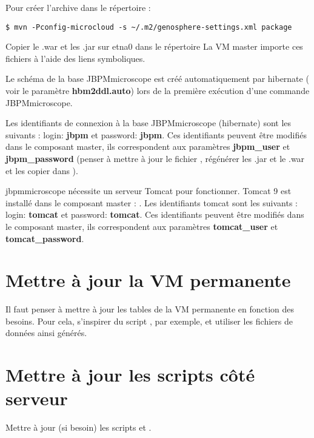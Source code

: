 Pour créer l'archive  dans le répertoire  :
\begin{lstlisting}[style=bash]
$ mvn -Pconfig-microcloud -s ~/.m2/genosphere-settings.xml package
\end{lstlisting}
\bigskip

Copier le .war et les .jar sur etna0 dans le répertoire 
La VM master importe ces fichiers à l’aide des liens symboliques.
\newline

Le schéma de la base JBPMmicroscope est créé automatiquement par hibernate ( voir le paramètre \textbf{hbm2ddl.auto}) lors de la première exécution d'une commande JBPMmicroscope.
\newline

Les identifiants de connexion à la base JBPMmicroscope (hibernate) sont les suivants :
login: \textbf{jbpm} et password: \textbf{jbpm}. Ces identifiants peuvent être modifiés dans le composant master, ils correspondent aux paramètres \textbf{jbpm\_user} et \textbf{jbpm\_password} (penser à mettre à jour le fichier , régénérer les .jar et le .war et les copier dans ).
\newline

jbpmmicroscope nécessite un serveur Tomcat pour fonctionner. Tomcat 9 est installé dans le composant master : . Les identifiants tomcat sont les suivants : login: \textbf{tomcat} et password: \textbf{tomcat}.
Ces identifiants peuvent être modifiés dans le composant master, ils correspondent aux paramètres \textbf{tomcat\_user} et \textbf{tomcat\_password}.

\section{Mettre à jour la VM permanente}
Il faut penser à mettre à jour les tables de la VM permanente en fonction des besoins. Pour cela, s'inspirer du script , par exemple, et utiliser les fichiers de données ainsi générés.

\section{Mettre à jour les scripts côté serveur}

Mettre à jour (si besoin) les scripts  et .
